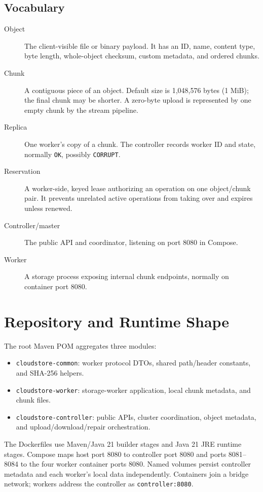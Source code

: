 \documentclass[11pt,a4paper]{article}
\begin{document}
\subsection{Vocabulary}
\begin{description}
\item[Object] The client-visible file or binary payload. It has an ID, name, content type, byte length, whole-object checksum, custom metadata, and ordered chunks.
\item[Chunk] A contiguous piece of an object. Default size is 1,048,576 bytes (1 MiB); the final chunk may be shorter. A zero-byte upload is represented by one empty chunk by the stream pipeline.
\item[Replica] One worker's copy of a chunk. The controller records worker ID and state, normally \texttt{OK}, possibly \texttt{CORRUPT}.
\item[Reservation] A worker-side, keyed lease authorizing an operation on one object/chunk pair. It prevents unrelated active operations from taking over and expires unless renewed.
\item[Controller/master] The public API and coordinator, listening on port 8080 in Compose.
\item[Worker] A storage process exposing internal chunk endpoints, normally on container port 8080.
\end{description}

\section{Repository and Runtime Shape}
The root Maven POM aggregates three modules:
\begin{itemize}
\item \texttt{cloudstore-common}: worker protocol DTOs, shared path/header constants, and SHA-256 helpers.
\item \texttt{cloudstore-worker}: storage-worker application, local chunk metadata, and chunk files.
\item \texttt{cloudstore-controller}: public APIs, cluster coordination, object metadata, and upload/download/repair orchestration.
\end{itemize}
The Dockerfiles use Maven/Java 21 builder stages and Java 21 JRE runtime stages. Compose maps host port 8080 to controller port 8080 and ports 8081--8084 to the four worker container ports 8080. Named volumes persist controller metadata and each worker's local data independently. Containers join a bridge network; workers address the controller as \texttt{controller:8080}.
\end{document}
